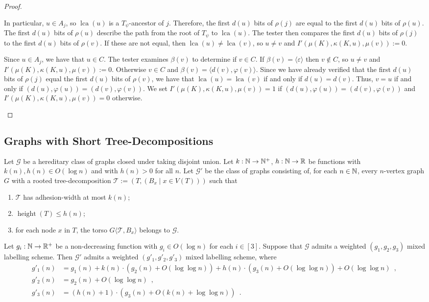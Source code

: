 \documentclass{patmorin}
\renewcommand{\le}{\leqslant}
\newcommand{\torso}[2]{{#1}\langle{#2}\rangle}
\DeclareMathOperator{\height}{height}
\DeclareMathOperator{\lca}{lca}
\newcommand{\Oh}{O}
\newcommand{\calG}{\mathcal{G}}
\newcommand{\calT}{\mathcal{T}}
\begin{document}
\begin{proof}
\begin{itemize}
          In particular, $u\in A_j$, so $\lca(u)$ is a $T_\psi$-ancestor of $j$.   Therefore, the first $d(u)$ bits of $\rho(j)$ are equal to the first $d(u)$ bits of $\rho(u)$.  The first $d(u)$ bits of $\rho(u)$ describe the path from the root of $T_\psi$ to $\lca(u)$.  The tester then compares the first $d(u)$ bits of $\rho(j)$ to the first $d(u)$ bits of $\rho(v)$.  If these are not equal,  then $\lca(u)\neq\lca(v)$, so $u\neq v$ and $I'(\mu(K),\kappa(K,u),\mu(v)):=0$.

          Since $u\in A_j$, we have that $u\in C$.  The tester examines $\beta(v)$ to determine if $v\in C$.  If $\beta(v)=\langle\varepsilon\rangle$ then $v\not\in C$, so $u\neq v$ and $I'(\mu(K),\kappa(K,u),\mu(v)):=0$. Otherwise $v\in C$ and $\beta(v)=\langle d(v),\varphi(v)\rangle$. Since we have already verified that the first $d(u)$ bits of $\rho(j)$ equal the first $d(u)$ bits of $\rho(v)$, we have that $\lca(u)=\lca(v)$ if and only if $d(u)=d(v)$. Thus, $v=u$ if and only if $(d(u),\varphi(u))=(d(v),\varphi(v))$.
          We set $I'(\mu(K),\kappa(K,u),\mu(v))=1$ if $(d(u),\varphi(u))=(d(v),\varphi(v))$ and $I'(\mu(K),\kappa(K,u),\mu(v))=0$ otherwise.\qedhere
  \end{itemize}
\end{proof}

\subsection{Graphs with Short Tree-Decompositions}
\label{sec:short}

\begin{lem}\label{small_height}
  Let $\calG$ be a hereditary class of graphs closed under taking disjoint union. Let $k:\mathbb{N}\to\mathbb{N}^+$,  $h:\mathbb{N}\to\mathbb{R}$ be functions with $k(n),h(n)\in \Oh(\log n)$ and with $h(n)>0$ for all $n$.   Let $\calG'$ be the class of graphs consisting of, for each $n\in\mathbb{N}$, every $n$-vertex graph $G$ with a rooted tree-decomposition $\calT:=(T,(B_x \mid x\in V(T)))$ such that
  \begin{enumerate}[nosep,nolistsep,label=(\rm{\roman*)}]
    \item $\calT$ has adhesion-width at most $k(n)$;
    \item $\height(T)\le h(n)$;
    \item for each node $x$ in $T$, the torso $\torso{G}{\calT,B_x}$ belongs to $\calG$.
  \end{enumerate}
  Let $g_i:\mathbb{N}\to\mathbb{R}^+$ be a non-decreasing function  with $g_i\in\Oh(\log n)$ for each $i\in[3]$. Suppose that $\calG$ admits a weighted $(g_1,g_2,g_3)$ mixed labelling scheme. Then $\calG'$ admits a weighted $(g'_1,g'_2,g'_3)$ mixed labelling scheme, where
  \begin{align*}
    g'_1(n)
     & = g_1(n)
    + k(n)\cdot (g_2(n)+\Oh(\log\log n))
    + h(n)\cdot (g_3(n)+\Oh(\log\log n)) +\Oh(\log\log n)\enspace, \\
    g'_2(n)
     & = g_2(n) + \Oh(\log\log n)\enspace,                         \\
    g'_3(n)
     & = (h(n)+1)\cdot (g_3(n)+\Oh(k(n)+\log\log n))\enspace.
  \end{align*}
\end{lem}
\end{document}
